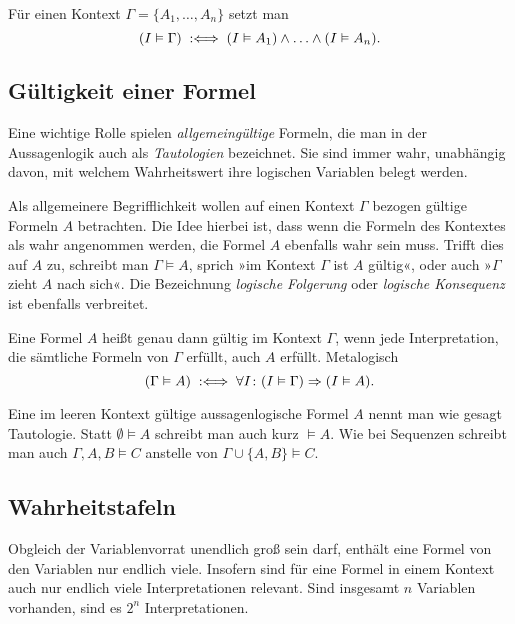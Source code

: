 \begin{Definition}\label{def:sat-context}
Für einen Kontext $\Gamma = \{A_1,\ldots,A_n\}$ setzt man
\[(I\vDash\Gamma)\;:\Longleftrightarrow\; (I\vDash A_1)\land\ldots\land (I\vDash A_n).\]
\end{Definition}

\subsection{Gültigkeit einer Formel}

Eine wichtige Rolle spielen \emph{allgemeingültige} Formeln, die man
in der Aussagenlogik auch als \emph{Tautologien}
bezeichnet. Sie sind immer wahr, unabhängig davon, mit welchem
Wahrheitswert ihre logischen Variablen belegt werden.

Als allgemeinere Begrifflichkeit wollen auf einen Kontext $\Gamma$
bezogen gültige Formeln $A$ betrachten. Die Idee hierbei ist,
dass wenn die Formeln des Kontextes als wahr angenommen werden, die
Formel $A$ ebenfalls wahr sein muss. Trifft dies auf $A$ zu,
schreibt man $\Gamma\models A$, sprich »im Kontext $\Gamma$ ist
$A$ gültig«, oder auch »$\Gamma$ zieht $A$ nach sich«. Die Bezeichnung
\emph{logische Folgerung} oder \emph{logische Konsequenz} ist
ebenfalls verbreitet.

\begin{Definition}\label{def:valid}\newlinefirst
Eine Formel $A$ heißt genau dann gültig im Kontext $\Gamma$,
wenn jede Interpretation, die sämtliche Formeln von $\Gamma$ erfüllt,
auch $A$ erfüllt. Metalogisch
\[(\Gamma\vDash A)\;:\Longleftrightarrow\; \forall I\colon (I\vDash\Gamma)\Rightarrow (I\vDash A).\]
\end{Definition}
Eine im leeren Kontext gültige aussagenlogische Formel $A$ nennt man
wie gesagt Tautologie. Statt $\emptyset\models A$ schreibt man auch
kurz $\models A$. Wie bei Sequenzen schreibt man auch $\Gamma,A,B\models C$
anstelle von $\Gamma\cup\{A,B\}\models C$.

\subsection{Wahrheitstafeln}

Obgleich der Variablenvorrat unendlich groß sein darf, enthält eine
Formel von den Variablen nur endlich viele. Insofern sind für eine
Formel in einem Kontext auch nur endlich viele Interpretationen relevant.
Sind insgesamt $n$ Variablen vorhanden, sind es $2^n$ Interpretationen.

